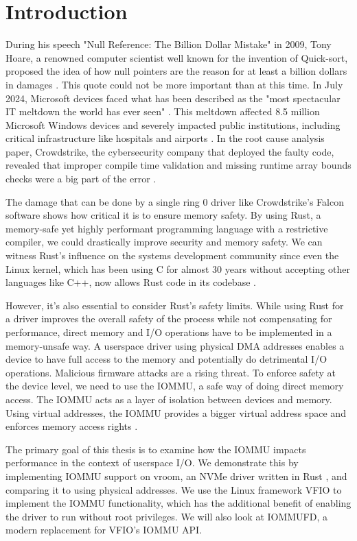 \chapter{Introduction}\label{c:introduction}

During his speech "Null Reference: The Billion Dollar Mistake" in 2009, Tony Hoare, a renowned computer scientist well known for the invention of Quick-sort, proposed the idea of how null pointers are the reason for at least a billion dollars in damages \cite{billiondollarmistake}. This quote could not be more important than at this time. In July 2024, Microsoft devices faced what has been described as the "most spectacular IT meltdown the world has ever seen" \cite{bloombergmeltdown}. This meltdown affected 8.5 million Microsoft Windows devices and severely impacted public institutions, including critical infrastructure like hospitals and airports \cite{bloomberg8milliondevices}. In the root cause analysis paper, Crowdstrike, the cybersecurity company that deployed the faulty code, revealed that improper compile time validation and missing runtime array bounds checks were a big part of the error \cite{crowdstrikerca}.

The damage that can be done by a single ring 0 driver like Crowdstrike's Falcon software shows how critical it is to ensure memory safety. By using Rust, a memory-safe yet highly performant programming language with a restrictive compiler, we could drastically improve security and memory safety. We can witness Rust's influence on the systems development community since even the Linux kernel, which has been using C for almost 30 years without accepting other languages like C++, now allows Rust code in its codebase \cite{linuxrustpull}.

However, it's also essential to consider Rust's safety limits. While using Rust for a driver improves the overall safety of the process while not compensating for performance, direct memory and I/O operations have to be implemented in a memory-unsafe way. A userspace driver using physical DMA addresses enables a device to have full access to the memory and potentially do detrimental I/O operations. Malicious firmware attacks are a rising threat.
To enforce safety at the device level, we need to use the IOMMU, a safe way of doing direct memory access. The IOMMU acts as a layer of isolation between devices and memory. Using virtual addresses, the IOMMU provides a bigger virtual address space and enforces memory access rights \cite{OLS2007}.

The primary goal of this thesis is to examine how the IOMMU impacts performance in the context of userspace I/O.
We demonstrate this by implementing IOMMU support on vroom, an NVMe driver written in Rust \cite{vroom}, and comparing it to using physical addresses. We use the Linux framework VFIO to implement the IOMMU functionality, which has the additional benefit of enabling the driver to run without root privileges. We will also look at IOMMUFD, a modern replacement for VFIO's IOMMU API.
